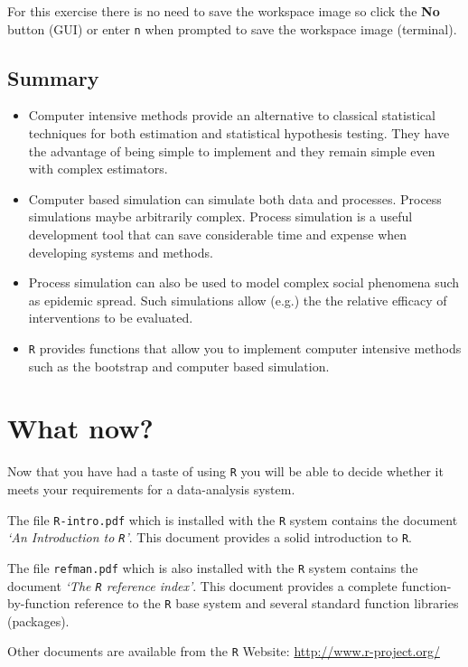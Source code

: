 \documentclass[
  12pt,
  a4paper]{book}
\begin{document}
For this exercise there is no need to save the workspace image so click the \textbf{No} button (GUI) or enter \texttt{n} when prompted to save the workspace image (terminal).

\hypertarget{summary-8}{%
\section{Summary}\label{summary-8}}

\begin{itemize}
\item
  Computer intensive methods provide an alternative to classical statistical techniques for both estimation and statistical hypothesis testing. They have the advantage of being simple to implement and they remain simple even with complex estimators.
\item
  Computer based simulation can simulate both data and processes. Process simulations maybe arbitrarily complex. Process simulation is a useful development tool that can save considerable time and expense when developing systems and methods.
\item
  Process simulation can also be used to model complex social phenomena such as epidemic spread. Such simulations allow (e.g.) the the relative efficacy of interventions to be evaluated.
\item
  \texttt{R} provides functions that allow you to implement computer intensive methods such as the bootstrap and computer based simulation.
\end{itemize}

\hypertarget{what-now}{%
\chapter*{What now?}\label{what-now}}

Now that you have had a taste of using \texttt{R} you will be able to decide whether it meets your requirements for a data-analysis system.

The file \texttt{R-intro.pdf} which is installed with the \texttt{R} system contains the document \emph{`An Introduction to \texttt{R}'}. This document provides a solid introduction to \texttt{R}.

The file \texttt{refman.pdf} which is also installed with the \texttt{R} system contains the document \emph{`The \texttt{R} reference index'}. This document provides a complete function-by-function reference to the \texttt{R} base system and several standard function libraries (packages).

Other documents are available from the \texttt{R} Website: \url{http://www.r-project.org/}

  
\end{document}
